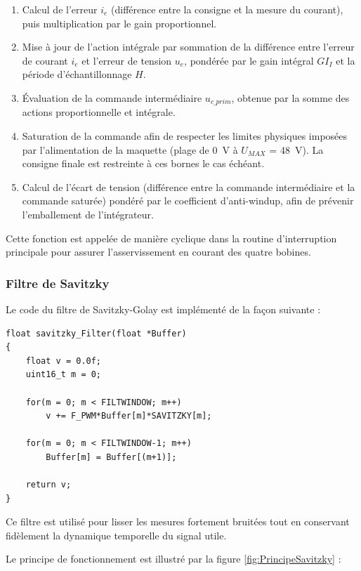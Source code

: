 \begin{enumerate}
    \item Calcul de l'erreur $i_e$ (différence entre la consigne et la mesure du courant), puis multiplication par le gain proportionnel.
    \item Mise à jour de l'action intégrale par sommation de la différence entre l'erreur de courant $i_e$ et l'erreur de tension $u_e$, pondérée par le gain intégral $GI_I$ et la période d'échantillonnage $H$.
    \item Évaluation de la commande intermédiaire $u_{c\_prim}$, obtenue par la somme des actions proportionnelle et intégrale.
    \item Saturation de la commande afin de respecter les limites physiques imposées par l'alimentation de la maquette (plage de 0~V à $U_{MAX}$ = 48~V). La consigne finale est restreinte à ces bornes le cas échéant.
    \item Calcul de l'écart de tension (différence entre la commande intermédiaire et la commande saturée) pondéré par le coefficient d'anti-windup, afin de prévenir l'emballement de l'intégrateur.
\end{enumerate}

Cette fonction est appelée de manière cyclique dans la routine d'interruption principale pour assurer l'asservissement en courant des quatre bobines.

\subsubsection{Filtre de Savitzky}
\label{subsubsec:Savitzky}
Le code du filtre de Savitzky-Golay est implémenté de la façon suivante :

\begin{verbatim}
float savitzky_Filter(float *Buffer)
{
    float v = 0.0f;
    uint16_t m = 0;

    for(m = 0; m < FILTWINDOW; m++)
        v += F_PWM*Buffer[m]*SAVITZKY[m];

    for(m = 0; m < FILTWINDOW-1; m++)
        Buffer[m] = Buffer[(m+1)];

    return v;
}
\end{verbatim}

Ce filtre \cite{Savitzky} est utilisé pour lisser les mesures fortement bruitées tout en conservant fidèlement la dynamique temporelle du signal utile.

Le principe de fonctionnement est illustré par la figure \ref{fig:PrincipeSavitzky} :

